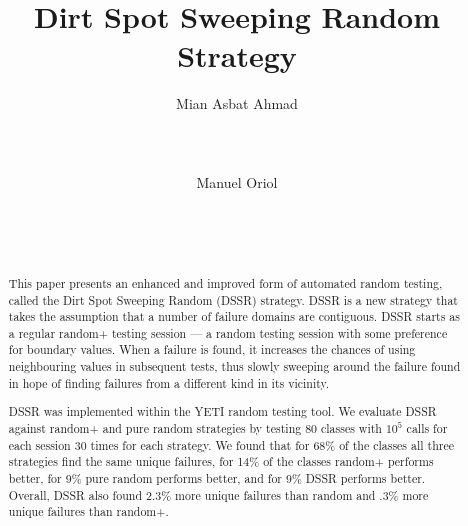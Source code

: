 \documentclass{acm_proc_article-sp}
\begin{document}
\title{Dirt Spot Sweeping Random Strategy}


%
\author{
%
%
\alignauthor
Mian Asbat Ahmad\\
       \\
       \\
       \\
\alignauthor
Manuel Oriol \\
       \\
       \\
       \\
}



\maketitle
\begin{abstract}
This paper presents an enhanced and improved form of automated random testing, called the Dirt Spot Sweeping Random (DSSR) strategy. DSSR is a new strategy that takes the assumption that a number of failure domains are contiguous.
DSSR starts as a regular random+ testing session --- a random testing session with some preference for boundary values. 
When a failure is found, it increases the chances of using neighbouring values in subsequent tests, thus slowly sweeping around the failure found in hope of finding failures from a different kind in its vicinity.

DSSR was implemented within the YETI random testing tool. We evaluate DSSR against random+ and pure random strategies by testing 80 classes with $10^5$ calls for each session 30 times for each strategy.
We found that for 68\% of the classes all three strategies find the same unique failures, for 14\% of the classes random+ performs better, for 9\% pure random performs better, and for 9\% DSSR performs better.
Overall, DSSR also found 2.3\% more unique failures than random and .3\% more unique failures than random+.
\end{abstract}
\end{document}

